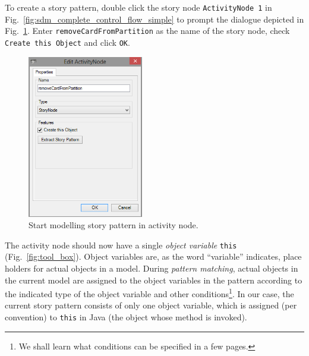 To create a story pattern, double click the story node \texttt{ActivityNode 1} in Fig.~\ref{fig:sdm_complete_control_flow_simple} to prompt the dialogue depicted in Fig.~\ref{fig:story_pattern}.  
Enter \texttt{remove\-Card\-From\-Partition} as the name of the story node, check \texttt{Create this Object} and click \texttt{OK}.

\begin{figure}[htpb]
\begin{center} 
  \includegraphics[width=0.45\textwidth]{pics/sdmBilder/removeCard/sdm07RAW.png}
  \caption{Start modelling story pattern in activity node.}  
  \label{fig:story_pattern}
\end{center}
\end{figure}

The activity node should now have a single \emph{object variable} \texttt{this}
(Fig.~\ref{fig:tool_box}). 
Object variables are, as the word ``variable'' indicates, place holders for actual objects in a model.  
During \emph{pattern matching},
actual objects in the  current model are assigned to the object variables in the pattern according to  the indicated type of the object variable and other conditions\footnote{We shall learn what conditions can be specified in a
few pages.}. 
In our case, the current story pattern consists of only one object variable, which is assigned (per convention) to \texttt{this} in Java (the object whose method is invoked).

